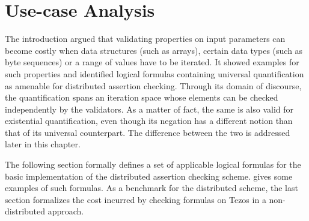 \chapter{Use-case Analysis}\label{chap:use_cases}
The introduction argued that validating properties on input parameters can become costly when data structures (such as arrays), certain data types (such as byte sequences) or a range of values have to be iterated. It showed examples for such properties and identified logical formulas containing universal quantification as amenable for distributed assertion checking. Through its domain of discourse, the quantification spans an iteration space whose elements can be checked independently by the validators. As a matter of fact, the same is also valid for existential quantification, even though its negation has a different notion than that of its universal counterpart. The difference between the two is addressed later in this chapter.

The following section formally defines a set of applicable logical formulas for the basic implementation of the distributed assertion checking scheme.  gives some examples of such formulas. As a benchmark for the distributed scheme, the last section formalizes the cost incurred by checking formulas on Tezos in a non-distributed approach.

